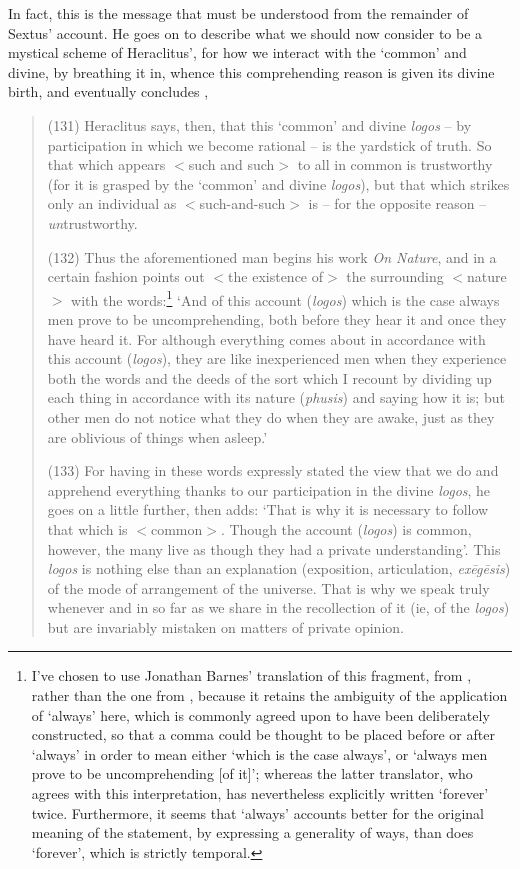 In fact, this is the message that must be understood from the remainder of Sextus' account. He goes on to describe what we should now consider to be a mystical scheme of Heraclitus', for how we interact with the `common' and divine, by breathing it in, whence this comprehending reason is given its divine birth, and eventually concludes \cite{Robinson1987},
\begin{quotation}
(131) Heraclitus says, then, that this `common' and divine \textit{logos} -- by participation in which we become rational -- is the yardstick of truth. So that which appears $<$such and such$>$ to all in common is trustworthy (for it is grasped by the `common' and divine \textit{logos}), but that which strikes only an individual as $<$such-and-such$>$ is -- for the opposite reason -- \textit{un}trustworthy.

(132) Thus the aforementioned man begins his work \textit{On Nature}, and in a certain fashion points out $<$the existence of$>$ the surrounding $<$nature$>$ with the words:\footnote{I've chosen to use Jonathan Barnes' translation of this fragment, from \cite{Barnes1982}, rather than the one from \cite{Robinson1987}, because it retains the ambiguity of the application of `always' here, which is commonly agreed upon to have been deliberately constructed, so that a comma could be thought to be placed before or after `always' in order to mean either `which is the case always', or `always men prove to be uncomprehending [of it]'; whereas the latter translator, who agrees with this interpretation, has nevertheless explicitly written `forever' twice. Furthermore, it seems that `always' accounts better for the original meaning of the statement, by expressing a generality of ways, than does `forever', which is strictly temporal.} `And of this account (\textit{logos}) which is the case always men prove to be uncomprehending, both before they hear it and once they have heard it. For although everything comes about in accordance with this account (\textit{logos}), they are like inexperienced men when they experience both the words and the deeds of the sort which I recount by dividing up each thing in accordance with its nature (\textit{phusis}) and saying how it is; but other men do not notice what they do when they are awake, just as they are oblivious of things when asleep.'

(133) For having in these words expressly stated the view that we do and apprehend everything thanks to our participation in the divine \textit{logos}, he goes on a little further, then adds: `That is why it is necessary to follow that which is $<$common$>$. Though the account (\textit{logos}) is common, however, the many live as though they had a private understanding'. This \textit{logos} is nothing else than an explanation (exposition, articulation, \textit{ex\={e}g\={e}sis}) of the mode of arrangement of the universe. That is why we speak truly whenever and in so far as we share in the recollection of it (ie, of the \textit{logos}) but are invariably mistaken on matters of private opinion.


\end{quotation}
